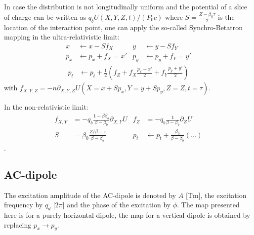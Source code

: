 \documentclass[english]{article}
\begin{document}
In case the distribution is not longitudinally uniform and the potential of a slice of charge can be written as
$q_b U(X,Y,Z,t)/(P_0 c)$ where $S=\frac{Z-\beta_0\tau}{2}$ is the location of the interaction point, 
one can apply the so-called Synchro-Betatron mapping in the ultra-relativistic limit:
\begin{align}
x &\leftarrow x- S f_X & 
y &\leftarrow y- S f_Y   \\
p_x &\leftarrow p_x+  f_X=x'   &
p_y &\leftarrow p_y+  f_Y=y' 
\end{align} 
\begin{align}
p_t & \leftarrow p_t  + \frac{1}{2}
   \left( f_Z 
        + f_X \frac{p_x +x'}{2} 
        + f_Y \frac{p_y +y'}{2} \right)
\end{align} with $f_{X,Y,Z}=- n \partial_{X,Y,Z} U(X=x+S p_x,Y=y+S p_y,Z=Z,t=\tau)$.

In the non-relativistic limit:
\begin{align}
f_{X,Y} &= - q_b \frac{1 -\beta \beta_b}{\beta - \beta_b} \partial_{X,Y} U&
f_Z &= - q_b \frac{1}{\beta - \beta_b} \partial_Z U \\
S&=\beta_0 \frac{Z/\beta-\tau}{\beta - \beta_b}&
p_t & \leftarrow p_t  + \frac{\beta_0}{\beta-\beta_b}\left(\ldots\right)
\end{align}.

\subsection{AC-dipole}
The excitation amplitude of the AC-dipole is denoted by $A$ [Tm], the excitation frequency by $q_d$ [$2\pi$] and the phase of the excitation by $\phi$. The map
presented here is for a purely horizontal dipole, the map for a vertical dipole is obtained by replacing $p_x\to p_y$.
\end{document}
